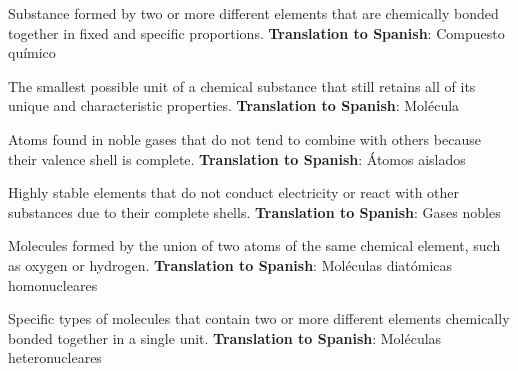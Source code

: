\begin{vocabulary}
    Substance formed by two or more different elements that are chemically bonded together in fixed and specific proportions. \newline
    \textbf{Translation to Spanish}: Compuesto químico \newline
\end{vocabulary}

\begin{vocabulary}[Molecule]
    The smallest possible unit of a chemical substance that still retains all of its unique and characteristic properties. \newline
    \textbf{Translation to Spanish}: Molécula \newline
\end{vocabulary}

\begin{vocabulary}
    Atoms found in noble gases that do not tend to combine with others because their valence shell is complete. \newline
    \textbf{Translation to Spanish}: Átomos aislados \newline
\end{vocabulary}

\begin{vocabulary}
    Highly stable elements that do not conduct electricity or react with other substances due to their complete shells. \newline
    \textbf{Translation to Spanish}: Gases nobles \newline
\end{vocabulary}

\begin{vocabulary}
    Molecules formed by the union of two atoms of the same chemical element, such as oxygen or hydrogen. \newline
    \textbf{Translation to Spanish}: Moléculas diatómicas homonucleares \newline
\end{vocabulary}

\begin{vocabulary}
    Specific types of molecules that contain two or more different elements chemically bonded together in a single unit. \newline
    \textbf{Translation to Spanish}: Moléculas heteronucleares \newline
\end{vocabulary}

